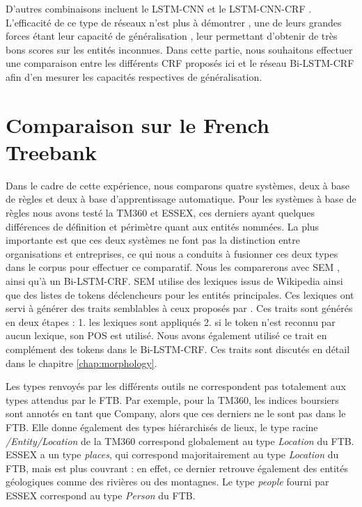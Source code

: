 \documentclass[12pt,a4paper,times,twoside,openright]{report}
\begin{document}
D'autres combinaisons incluent le LSTM-CNN \citep{chiu2015named} et le LSTM-CNN-CRF \citep{ma2016end}. L'efficacité de ce type de réseaux n'est plus à démontrer \citep{huang2015bidirectional,lample2016neural}, une de leurs grandes forces étant leur capacité de généralisation \citep{augenstein2017generalisation}, leur permettant d'obtenir de très bons scores sur les entités inconnues. Dans cette partie, nous souhaitons effectuer une comparaison entre les différents CRF proposés ici et le réseau Bi-LSTM-CRF afin d'en mesurer les capacités respectives de généralisation.


    
    \section{Comparaison sur le French Treebank}
    \label{sec:ftb-comparo}
Dans le cadre de cette expérience, nous comparons quatre systèmes, deux à base de règles et deux à base d'apprentissage automatique. Pour les systèmes à base de règles nous avons testé la TM360 et ESSEX, ces derniers ayant quelques différences de définition et périmètre quant aux entités nommées. La plus importante est que ces deux systèmes ne font pas la distinction entre organisations et entreprises, ce qui nous a conduits à fusionner ces deux types dans le corpus pour effectuer ce comparatif. Nous les comparerons avec SEM \citep{dupont2014reconnaisseur}, ainsi qu'à un Bi-LSTM-CRF. SEM utilise des lexiques issus de Wikipedia ainsi que des listes de tokens déclencheurs pour les entités principales. Ces lexiques ont servi à générer des traits semblables à ceux proposés par \citet{raymond2010reconnaissance}. Ces traits sont générés en deux étapes : 1. les lexiques sont appliqués 2. si le token n'est reconnu par aucun lexique, son POS est utilisé. Nous avons également utilisé ce trait en complément des tokens dans le Bi-LSTM-CRF. Ces traits sont discutés en détail dans le chapitre \ref{chap:morphology}.

Les types renvoyés par les différents outils ne correspondent pas totalement aux types attendus par le FTB. Par exemple, pour la TM360, les indices boursiers sont annotés en tant que Company, alors que ces derniers ne le sont pas dans le FTB. Elle donne également des types hiérarchisés de lieux, le type racine \emph{/Entity/Location} de la TM360 correspond globalement au type \emph{Location} du FTB. ESSEX a un type \emph{places}, qui correspond majoritairement au type \emph{Location} du FTB, mais est plus couvrant : en effet, ce dernier retrouve également des entités géologiques comme des rivières ou des montagnes. Le type \emph{people} fourni par ESSEX correspond au type \emph{Person} du FTB.
\end{document}
